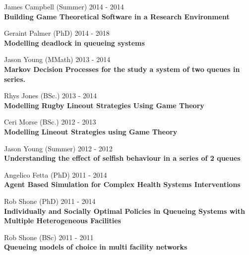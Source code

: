 \documentclass[10pt]{res} %
\begin{document}
\begin{resume}
\begin{etaremune}
\item
    James Campbell (Summer) \hfill 2014 -
    2014\\
\textbf{Building Game Theoretical Software in a Research Environment}\\

\item
    Geraint Palmer (PhD) \hfill 2014 -
    2018\\
\textbf{Modelling deadlock in queueing systems}\\

\item
    Jason Young (MMath) \hfill 2013 -
    2014\\
\textbf{Markov Decision Processes for the study a system of two queues in series.}\\

\item
    Rhys Jones (BSc.) \hfill 2013 -
    2014\\
\textbf{Modelling Rugby Lineout Strategies Using Game Theory}\\

\item
    Ceri Morse (BSc.) \hfill 2012 -
    2013\\
\textbf{Modelling Lineout Strategies using Game Theory}\\

\item
    Jason Young (Summer) \hfill 2012 -
    2012\\
\textbf{Understanding the effect of selfish behaviour in a series of 2 queues}\\

\item
    Angelico Fetta (PhD) \hfill 2011 -
    2014\\
\textbf{Agent Based Simulation for Complex Health Systems Interventions}\\

\item
    Rob Shone (PhD) \hfill 2011 -
    2014\\
\textbf{Individually and Socially Optimal Policies in Queueing Systems with Multiple Heterogeneous Facilities}\\

\item
    Rob Shone (BSc) \hfill 2011 -
    2011\\
\textbf{Queueing models of choice in multi facility networks}\\


\end{etaremune}
\end{resume}
\end{document}
